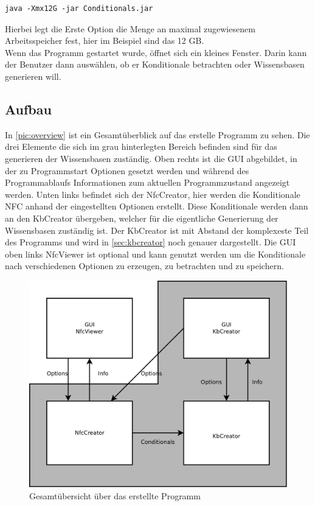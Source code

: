 \documentclass[12pt,a4paper]{article}
\begin{document}
\begin{lstlisting}
java -Xmx12G -jar Conditionals.jar 
\end{lstlisting}

Hierbei legt die Erste Option die Menge an maximal zugewiesenem Arbeitsspeicher fest, hier im Beispiel sind das 12 GB. \\
Wenn das Programm gestartet wurde, öffnet sich ein kleines Fenster. Darin kann der Benutzer dann  auswählen, ob er Konditionale betrachten oder Wissensbasen generieren will.



\subsection{Aufbau}
In \autoref{pic:overview} ist ein Gesamtüberblick auf das erstelle Programm zu sehen. Die drei Elemente die sich im grau hinterlegten Bereich befinden sind für das generieren der Wissensbasen zuständig. Oben rechts ist die GUI abgebildet, in der zu Programmstart Optionen gesetzt werden und während des Programmablaufs Informationen zum aktuellen Programmzustand angezeigt werden. Unten links befindet sich der NfcCreator, hier werden die Konditionale NFC anhand der eingestellten Optionen erstellt. Diese Konditionale werden dann an den KbCreator übergeben, welcher für die eigentliche Generierung der Wissensbasen zuständig ist. Der KbCreator ist mit Abstand der komplexeste Teil des Programms und wird in \autoref{sec:kbcreator} noch genauer dargestellt. Die GUI oben links NfcViewer ist optional und kann genutzt werden um die Konditionale nach verschiedenen Optionen zu erzeugen, zu betrachten und zu speichern.
\begin{figure}
\includegraphics[width=0.7\linewidth]{bilder/overview.png}

\caption{Gesamtübersicht über das erstellte Programm}
\label{pic:overview}
\end{figure}
\end{document}
